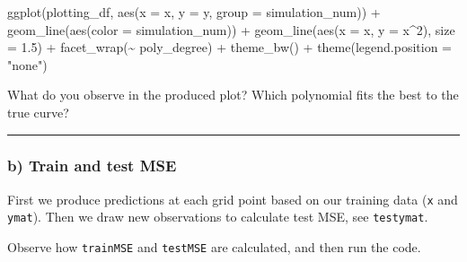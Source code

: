 \documentclass[
]{article}
\newenvironment{Shaded}{\begin{snugshade}}{\end{snugshade}}
\newcommand{\AttributeTok}[1]{\textcolor[rgb]{0.77,0.63,0.00}{#1}}
\newcommand{\DecValTok}[1]{\textcolor[rgb]{0.00,0.00,0.81}{#1}}
\newcommand{\FloatTok}[1]{\textcolor[rgb]{0.00,0.00,0.81}{#1}}
\newcommand{\FunctionTok}[1]{\textcolor[rgb]{0.00,0.00,0.00}{#1}}
\newcommand{\NormalTok}[1]{#1}
\newcommand{\SpecialCharTok}[1]{\textcolor[rgb]{0.00,0.00,0.00}{#1}}
\newcommand{\StringTok}[1]{\textcolor[rgb]{0.31,0.60,0.02}{#1}}
\begin{document}
\begin{Shaded}
\begin{Highlighting}[]
\FunctionTok{ggplot}\NormalTok{(plotting\_df, }\FunctionTok{aes}\NormalTok{(}\AttributeTok{x =}\NormalTok{ x, }\AttributeTok{y =}\NormalTok{ y, }\AttributeTok{group =}\NormalTok{ simulation\_num)) }\SpecialCharTok{+}
  \FunctionTok{geom\_line}\NormalTok{(}\FunctionTok{aes}\NormalTok{(}\AttributeTok{color =}\NormalTok{ simulation\_num)) }\SpecialCharTok{+}
  \FunctionTok{geom\_line}\NormalTok{(}\FunctionTok{aes}\NormalTok{(}\AttributeTok{x =}\NormalTok{ x, }\AttributeTok{y =}\NormalTok{ x}\SpecialCharTok{\^{}}\DecValTok{2}\NormalTok{), }\AttributeTok{size =} \FloatTok{1.5}\NormalTok{) }\SpecialCharTok{+}
  \FunctionTok{facet\_wrap}\NormalTok{(}\SpecialCharTok{\textasciitilde{}}\NormalTok{ poly\_degree) }\SpecialCharTok{+}
  \FunctionTok{theme\_bw}\NormalTok{() }\SpecialCharTok{+}
  \FunctionTok{theme}\NormalTok{(}\AttributeTok{legend.position =} \StringTok{"none"}\NormalTok{)}
\end{Highlighting}
\end{Shaded}

What do you observe in the produced plot? Which polynomial fits the best
to the true curve?

\begin{center}\rule{0.5\linewidth}{0.5pt}\end{center}

\hypertarget{b-train-and-test-mse}{%
\subsubsection{b) Train and test MSE}\label{b-train-and-test-mse}}

First we produce predictions at each grid point based on our training
data (\texttt{x} and \texttt{ymat}). Then we draw new observations to
calculate test MSE, see \texttt{testymat}.

Observe how \texttt{trainMSE} and \texttt{testMSE} are calculated, and
then run the code.
\end{document}
